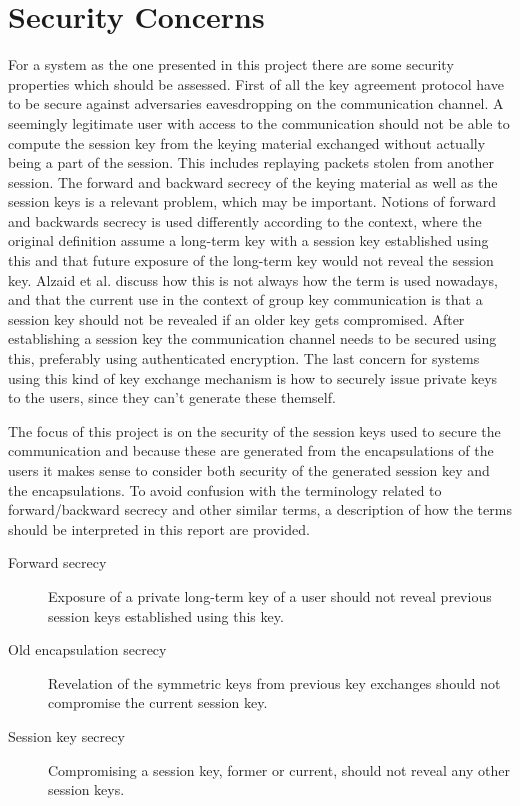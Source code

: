 \section{Security Concerns}\label{sec:concerns}
For a system as the one presented in this project there are some security properties which should be assessed. First of all the key agreement protocol have to be secure against adversaries eavesdropping on the communication channel. A seemingly legitimate user with access to the communication should not be able to compute the session key from the keying material exchanged without actually being a part of the session. This includes replaying packets stolen from another session. The forward and backward secrecy of the keying material as well as the session keys is a relevant problem, which may be important. Notions of forward and backwards secrecy is used differently according to the context, where the original definition assume a long-term key with a session key established using this and that future exposure of the long-term key would not reveal the session key. Alzaid et al. \cite{Alzaid2010} discuss how this is not always how the term is used nowadays, and that the current use in the context of group key communication is that a session key should not be revealed if an older key gets compromised. After establishing a session key the communication channel needs to be secured using this, preferably using authenticated encryption. The last concern for systems using this kind of key exchange mechanism is how to securely issue private keys to the users, since they can't generate these themself.      


\par The focus of this project is on the security of the session keys used to secure the communication and because these are generated from the encapsulations of the users it makes sense to consider both security of the generated session key and the encapsulations. To avoid confusion with the terminology related to forward/backward secrecy and other similar terms, a description of how the terms should be interpreted in this report are provided.

\begin{description}
\item[Forward secrecy] Exposure of a private long-term key of a user should not reveal previous session keys established using this key. 
\item[Old encapsulation secrecy]Revelation of the symmetric keys from previous key exchanges should not compromise the current session key.
\item[Session key secrecy] Compromising a session key, former or current, should not reveal any other session keys.
\end{description}

